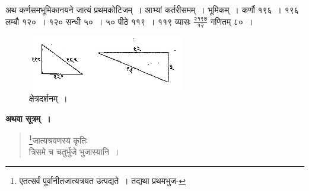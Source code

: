 \documentclass[11pt, openany]{book}
\begin{document}
अथ कर्णसमभूमिकानयने जात्यं प्रथमकोटिजम्~। आभ्यां कर्तरीसमम्~। भूमिकम्~। 
कर्णौ १९६~। १९६ लम्बौ १२०~। १२० सन्धी ५०~। ५० पीठे ११९~। ११९
व्यासः $\frac{\mbox{२१९७}}{\mbox{१२}}$ गणितम् ८०~। 
\begin{figure}[h!]
    \centering
      \captionsetup{labelformat=empty}
 \caption{क्षेत्रदर्शनम्~।}
 \vspace{-2mm}

 \includegraphics[scale=0.8]{graphics/capture112.png}
\end{figure}

\textbf{अथवा सूत्रम्~।} 
\begin{quote}
    \bs 
    \footnote{एतत्सर्वं पूर्वानीतजात्यत्रयत उत्पद्यते~। तद्यथा प्रथमभुज-}जात्यश्रवणस्य कृतिः\\
    त्रिसमे च चतुर्भुजे भुजास्यानि~।
 \end{quote}
 \newpage
\end{document}
